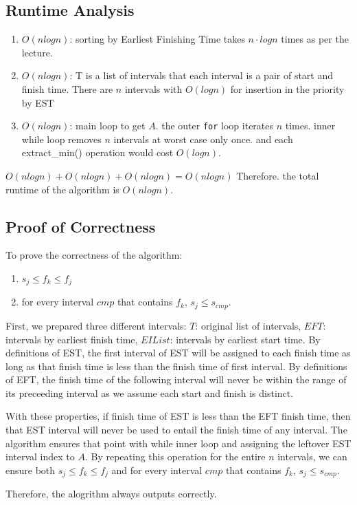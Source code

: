 \documentclass[11pt]{article}
\begin{document}
\subsection{Runtime Analysis}
\begin{enumerate}
\item $O(nlogn)$: sorting by Earliest Finishing Time takes $n \cdot log n$ times as per the lecture.
\item $O(nlogn)$: T is a list of intervals that each interval is a pair of start and finish time. There are $n$ intervals with $O(logn)$ for insertion in the priority by EST
\item $O(nlogn)$: main loop to get $A$. the outer \texttt{for} loop iterates $n$ times. inner while loop removes $n$ intervals at worst case only once. and each extract\_min() operation would cost $O(logn)$.
\end{enumerate}

$O(nlogn)+O(nlogn)+O(nlogn)=O(nlogn)$
Therefore. the total runtime of the algorithm is $O(nlogn)$.

\subsection{Proof of Correctness}
To prove the correctness of the algorithm:
\begin{enumerate}
\item $s_j \le f_k \le f_j$
\item for every interval $cmp$ that contains $f_k$, $s_j \le s_{cmp}$.
\end{enumerate}

First, we prepared three different intervals: $T$: original list of intervals, $EFT$: intervals by earliest finish time, $EIList$: intervals by earliest start time. By definitions of EST, the first interval of EST will be assigned to each finish time as long as that finish time is less than the finish time of first interval. By definitions of EFT, the finish time of the following interval will never be within the range of its preceeding interval as we assume each start and finish is distinct.

With these properties, if finish time of EST is less than the EFT finish time, then that EST interval will never be used to entail the finish time of any interval. The algorithm ensures that point with while inner loop and assigning the leftover EST interval index to $A$. By repeating this operation for the entire $n$ intervals, we can ensure both $s_j \le f_k \le f_j$ and for every interval $cmp$ that contains $f_k$, $s_j \le s_{cmp}$.

Therefore, the alogrithm always outputs correctly.
\end{document}
